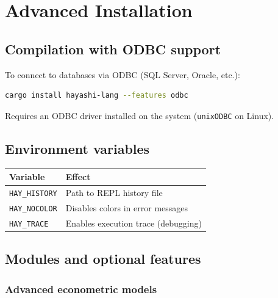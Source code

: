 \chapter{Advanced Installation}
\label{apendice:instalacao}

\section{Compilation with ODBC support}

To connect \hayashi{} to databases via ODBC (SQL Server, Oracle, etc.):

\begin{lstlisting}[style=inline, language=sh]
cargo install hayashi-lang --features odbc
\end{lstlisting}

Requires an ODBC driver installed on the system (\texttt{unixODBC} on Linux).

\section{Environment variables}

\begin{center}
\begin{tabular}{ll}
\toprule
\textbf{Variable} & \textbf{Effect} \\
\midrule
\texttt{HAY\_HISTORY}  & Path to REPL history file \\
\texttt{HAY\_NOCOLOR}  & Disables colors in error messages \\
\texttt{HAY\_TRACE}    & Enables execution trace (debugging) \\
\bottomrule
\end{tabular}
\end{center}

\section{Modules and optional features}

\subsection*{Advanced econometric models}

